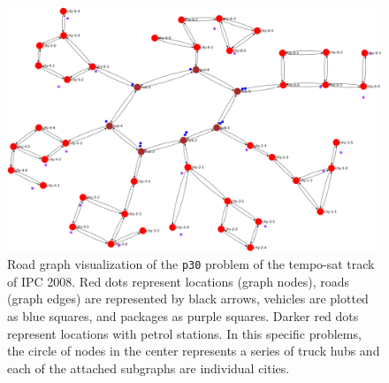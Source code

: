 \begin{figure}[tb]
\begin{center}
\includegraphics[width=1.0\textwidth]{../img/ipc08_tempo-sat_p30_land}
\end{center}
\caption[Visualization of the \texttt{p30} problem of temporal Transport from IPC 2008.]{Road graph visualization of the \texttt{p30} problem of the tempo-sat track of IPC 2008. Red dots represent locations (graph nodes), roads (graph edges) are represented by black arrows, vehicles are plotted as blue squares, and packages as purple squares. Darker red dots represent locations with petrol stations. In this specific problems, the circle of nodes in the center represents a series of truck hubs and each of the attached subgraphs are individual cities.}
\label{fig:ipc08_tempo-sat_p30}
\end{figure}

